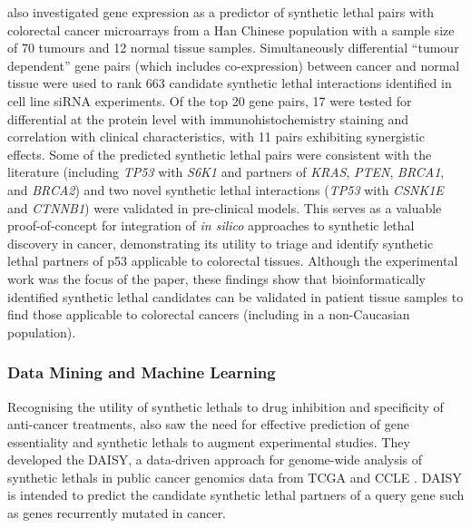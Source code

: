 \citet{Tiong2014} also investigated \gls{gene expression} as a predictor of \gls{synthetic lethal} pairs with colorectal cancer \glspl{microarray} from a Han Chinese population with a sample size of 70 tumours and 12 normal tissue samples. Simultaneously differential  ``tumour dependent'' gene pairs (which includes co-expression) between cancer and normal tissue were used to rank 663 candidate \gls{synthetic lethal} interactions identified in cell line \gls{siRNA} experiments. Of the top 20 gene pairs, 17 were tested for differential  at the protein level with immunohistochemistry staining and correlation with clinical characteristics, with 11 pairs exhibiting synergistic effects. Some of the predicted \gls{synthetic lethal} pairs were consistent with the literature (including \textit{TP53} with \textit{S6K1} and partners of \textit{KRAS},  \textit{PTEN}, \textit{BRCA1}, and \textit{BRCA2}) and two novel \gls{synthetic lethal} interactions (\textit{TP53} with \textit{CSNK1E} and \textit{CTNNB1}) were validated in pre-clinical models. This serves as a valuable proof-of-concept for integration of \textit{in silico} approaches to \gls{synthetic lethal} discovery in cancer, demonstrating its utility to triage and identify \gls{synthetic lethal} partners of p53 applicable to colorectal tissues. Although the experimental work was the focus of the paper, these findings show that bioinformatically identified \gls{synthetic lethal} candidates can be validated in patient tissue samples to find those applicable to colorectal cancers (including in a non-Caucasian population).

\subsubsection{Data Mining and Machine Learning}


Recognising the utility of \glspl{synthetic lethal} to drug inhibition and specificity of anti-cancer \glspl{treatment}, \citet{Jerby2014} also saw the need for effective prediction of gene essentiality and \glspl{synthetic lethal} to augment experimental studies. They developed the \gls{DAISY}, a data-driven approach for \gls{genome}-wide analysis of \glspl{synthetic lethal} in public cancer \glspl{genomic} data from \gls{TCGA} and CCLE  \citep{Barretina2012}. \gls{DAISY} is intended to predict the candidate \gls{synthetic lethal} partners of a query gene such as genes recurrently mutated in cancer.  

